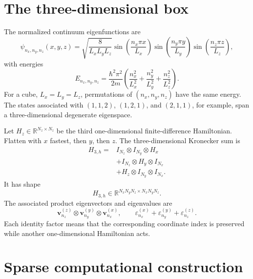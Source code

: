 \section{The three-dimensional box}

The normalized continuum eigenfunctions are
\begin{equation}
  \psi_{n_x,n_y,n_z}(x,y,z)
  =\sqrt{\frac{8}{L_xL_yL_z}}
   \sin\!\left(\frac{n_x\pi x}{L_x}\right)
   \sin\!\left(\frac{n_y\pi y}{L_y}\right)
   \sin\!\left(\frac{n_z\pi z}{L_z}\right),
\end{equation}
with energies
\begin{equation}
  E_{n_x,n_y,n_z}
  =\frac{\hbar^2\pi^2}{2m}
   \left(
     \frac{n_x^2}{L_x^2}
     +\frac{n_y^2}{L_y^2}
     +\frac{n_z^2}{L_z^2}
   \right).
\end{equation}
For a cube, \(L_x=L_y=L_z\), permutations of
\((n_x,n_y,n_z)\) have the same energy. The states associated with
\((1,1,2)\), \((1,2,1)\), and \((2,1,1)\), for example, span a
three-dimensional degenerate eigenspace.

Let \(H_z\in\mathbb R^{N_z\times N_z}\) be the third one-dimensional
finite-difference Hamiltonian. Flatten with \(x\) fastest, then \(y\), then
\(z\). The three-dimensional Kronecker sum is
\begin{align}
  H_{3,h}
  ={}&I_{N_z}\otimes I_{N_y}\otimes H_x\\
     &+I_{N_z}\otimes H_y\otimes I_{N_x}\\
     &+H_z\otimes I_{N_y}\otimes I_{N_x}.
\end{align}
It has shape
\begin{equation}
  H_{3,h}
  \in\mathbb R^{N_xN_yN_z\times N_xN_yN_z}.
\end{equation}
The associated product eigenvectors and eigenvalues are
\begin{equation}
  \mathbf v_{n_z}^{(z)}\otimes
  \mathbf v_{n_y}^{(y)}\otimes
  \mathbf v_{n_x}^{(x)},
  \qquad
  \varepsilon_{n_x}^{(x)}
  +\varepsilon_{n_y}^{(y)}
  +\varepsilon_{n_z}^{(z)}.
\end{equation}
Each identity factor means that the corresponding coordinate index is preserved
while another one-dimensional Hamiltonian acts.

\section{Sparse computational construction}


